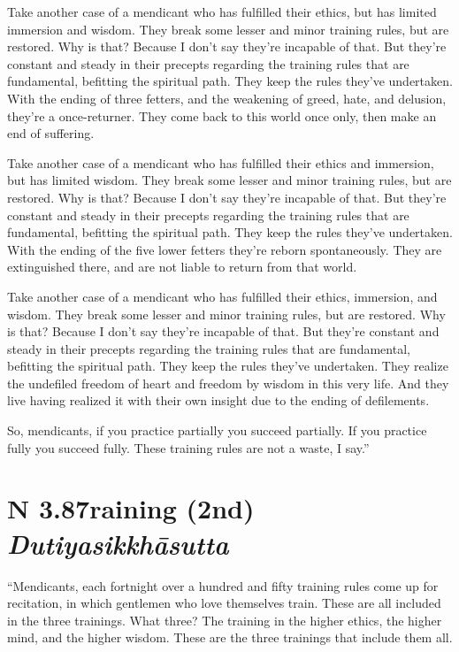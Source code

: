 \documentclass[12pt,openany]{book}%
\newcommand*{\suttatitleacronym}[1]{\smaller[2]{#1}\vspace*{.3em}}
\newcommand*{\suttatitletranslation}[1]{\linebreak{#1}}
\newcommand*{\suttatitleroot}[1]{\linebreak\smaller[2]\itshape{#1}}
\newcommand*{\tocacronym}[1]{\hspace*{-3.3em}{#1}\quad}
\newcommand*{\toctranslation}[1]{#1}
\newcommand*{\tocroot}[1]{(\textit{#1})}
\begin{document}
Take another case of a mendicant who has fulfilled their ethics, but has limited immersion and wisdom. They break some lesser and minor training rules, but are restored. Why is that? Because I don’t say they’re incapable of that. But they’re constant and steady in their precepts regarding the training rules that are fundamental, befitting the spiritual path. They keep the rules they’ve undertaken. With the ending of three fetters, and the weakening of greed, hate, and delusion, they’re a once-returner. They come back to this world once only, then make an end of suffering. 

Take another case of a mendicant who has fulfilled their ethics and immersion, but has limited wisdom. They break some lesser and minor training rules, but are restored. Why is that? Because I don’t say they’re incapable of that. But they’re constant and steady in their precepts regarding the training rules that are fundamental, befitting the spiritual path. They keep the rules they’ve undertaken. With the ending of the five lower fetters they’re reborn spontaneously. They are extinguished there, and are not liable to return from that world. 

Take another case of a mendicant who has fulfilled their ethics, immersion, and wisdom. They break some lesser and minor training rules, but are restored. Why is that? Because I don’t say they’re incapable of that. But they’re constant and steady in their precepts regarding the training rules that are fundamental, befitting the spiritual path. They keep the rules they’ve undertaken. They realize the undefiled freedom of heart and freedom by wisdom in this very life. And they live having realized it with their own insight due to the ending of defilements. 

So, mendicants, if you practice partially you succeed partially. If you practice fully you succeed fully. These training rules are not a waste, I say.” 

%
\section*{{\suttatitleacronym AN 3.87}{\suttatitletranslation Training (2nd) }{\suttatitleroot Dutiyasikkhāsutta}}
\addcontentsline{toc}{section}{\tocacronym{AN 3.87} \toctranslation{Training (2nd) } \tocroot{Dutiyasikkhāsutta}}

“Mendicants, each fortnight over a hundred and fifty training rules come up for recitation, in which gentlemen who love themselves train. These are all included in the three trainings. What three? The training in the higher ethics, the higher mind, and the higher wisdom. These are the three trainings that include them all. 
\end{document}
